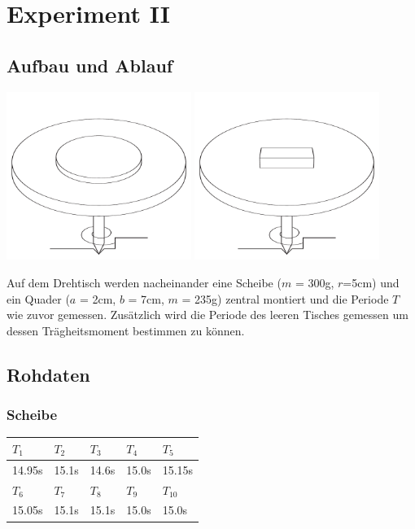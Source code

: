 \documentclass[12pt,a4paper]{article}
\begin{document}
\section*{Experiment II}
\subsection*{Aufbau und Ablauf}
\begin{center}
\includegraphics[width=6cm]{illustration21.pdf}
\includegraphics[width=6cm]{illustration22.pdf}
\end{center}
Auf dem Drehtisch werden nacheinander eine Scheibe ($m$ = 300g, $r$=5cm) und ein Quader ($a$ = 2cm, $b$ = 7cm, $m$ = 235g) zentral montiert und die Periode $T$ wie zuvor gemessen. Zus\"atzlich wird die Periode des leeren Tisches gemessen um dessen Tr\"agheitsmoment bestimmen zu k\"onnen.

\subsection*{Rohdaten}
\subsubsection*{Scheibe}
\begin{tabular}{|l|l|l|l|l|}
\hline
$T_{1}$&$T_{2}$&$T_{3}$&$T_{4}$&$T_{5}$\\
\hline
14.95s&15.1s&14.6s&15.0s&15.15s\\
\hline
\hline
$T_{6}$&$T_{7}$&$T_{8}$&$T_{9}$&$T_{10}$\\
\hline
15.05s&15.1s&15.1s&15.0s&15.0s\\
\hline
\end{tabular}
\end{document}
